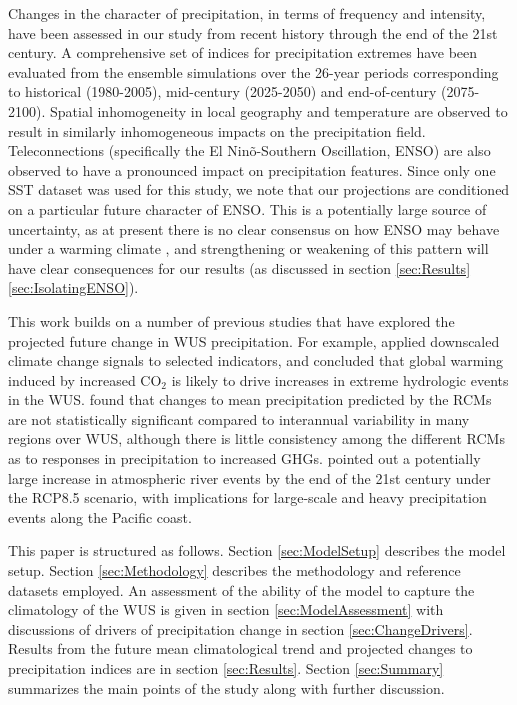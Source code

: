 \documentclass{ametsoc}
\begin{document}
Changes in the character of precipitation, in terms of frequency and intensity, have been assessed in our study from recent history through the end of the 21st century.  A comprehensive set of indices for precipitation extremes have been evaluated from the ensemble simulations over the 26-year periods corresponding to historical (1980-2005), mid-century (2025-2050) and end-of-century (2075-2100). Spatial inhomogeneity in local geography and temperature are observed to result in similarly inhomogeneous impacts on the precipitation field.  Teleconnections (specifically the El Nin\~o-Southern Oscillation, ENSO) are also observed to have a pronounced impact on precipitation features.  Since only one SST dataset was used for this study, we note that our projections are conditioned on a particular future character of ENSO.  This is a potentially large source of uncertainty, as at present there is no clear consensus on how ENSO may behave under a warming climate \citep{fedorov2000nino, latif2009nino, guilyardi2009understanding, collins2010impact, dinezio2012mean}, and strengthening or weakening of this pattern will have clear consequences for our results (as discussed in section \ref{sec:Results}\ref{sec:IsolatingENSO}).


This work builds on a number of previous studies that have explored the projected future change in WUS precipitation. For example, \cite{kim2005projection} applied downscaled climate change signals to selected indicators, and concluded that global warming induced by increased CO$_2$ is likely to drive increases in extreme hydrologic events in the WUS. \cite{duffy2006simulations} found that changes to mean precipitation predicted by the RCMs are not statistically significant compared to interannual variability in many regions over WUS, although there is little consistency among the different RCMs as to responses in precipitation to increased GHGs. \cite{gao2015dynamical} pointed out a potentially large increase in atmospheric river events by the end of the 21st century under the RCP8.5 scenario, with implications for large-scale and heavy precipitation events along the Pacific coast. 


This paper is structured as follows. Section \ref{sec:ModelSetup} describes the model setup.  Section \ref{sec:Methodology} describes the methodology and reference datasets employed. An assessment of the ability of the model to capture the climatology of the WUS is given in section \ref{sec:ModelAssessment} with discussions of drivers of precipitation change in section \ref{sec:ChangeDrivers}. Results from the future mean climatological trend and projected changes to precipitation indices are in section \ref{sec:Results}. Section \ref{sec:Summary} summarizes the main points of the study along with further discussion.
\end{document}
